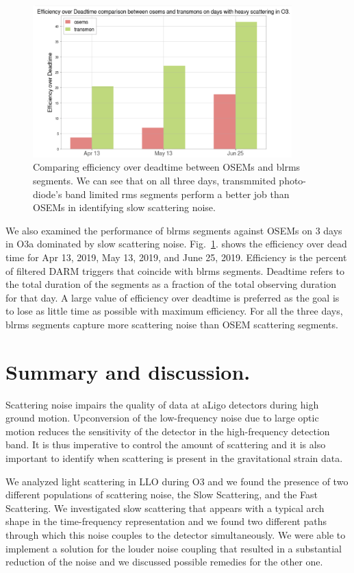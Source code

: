 \documentclass[12pt]{iopart}
\begin{document}
\begin{figure}[h]
    \centering
    \includegraphics[width=10cm]{osemstrans.png}
    \caption{Comparing efficiency over deadtime between OSEMs and blrms segments. We can see that on all three days, transmmited photo-diode's band limited rms segments perform a better job than OSEMs in identifying slow scattering noise.}
    \label{fig:osemtrans}
\end{figure}
\vspace{2cm}
We also examined the performance of blrms segments against OSEMs on 3 days in O3a dominated by slow scattering noise. Fig.~\ref{fig:osemtrans}. shows the efficiency over dead time for Apr 13, 2019, May 13, 2019, and June 25, 2019. Efficiency is the percent of filtered DARM triggers that coincide with blrms segments. Deadtime refers to the total duration of the segments as a fraction of the total observing duration for that day. A large value of efficiency over deadtime is preferred as the goal is to lose as little time as possible with maximum efficiency. For all the three days, blrms segments capture more scattering noise than OSEM scattering segments.

\newpage
\section{Summary and discussion.}\label{summary}
 Scattering noise impairs the quality of data at  aLigo detectors during high ground motion. Upconversion of the low-frequency noise due to large optic motion reduces the sensitivity of the detector in the high-frequency detection band. It is thus imperative to control the amount of scattering and it is also important to identify when scattering is present in the gravitational strain data. 

We analyzed light scattering in LLO during O3 and we found the presence of two different populations of scattering noise, the Slow Scattering, and the Fast Scattering. We investigated slow scattering that appears with a typical arch shape in the time-frequency representation and we found two different paths through which this noise couples to the detector simultaneously. We were able to implement a solution for the louder noise coupling that resulted in a substantial reduction of the noise and we discussed possible remedies for the other one. 
\end{document}
